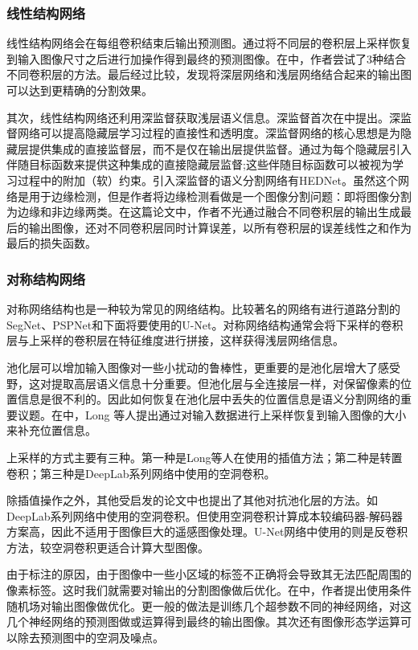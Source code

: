 \subsubsection{线性结构网络}
线性结构网络会在每组卷积结束后输出预测图。通过将不同层的卷积层上采样恢复到输入图像尺寸之后进行加操作得到最终的预测图像。在\cite{long2015fully}中，作者尝试了3种结合不同卷积层的方法。最后经过比较，发现将深层网络和浅层网络结合起来的输出图可以达到更精确的分割效果。

其次，线性结构网络还利用深监督获取浅层语义信息。深监督首次在\cite{lee2015deeply}中提出。深监督网络可以提高隐藏层学习过程的直接性和透明度。深监督网络的核心思想是为隐藏层提供集成的直接监督层，而不是仅在输出层提供监督。通过为每个隐藏层引入伴随目标函数来提供这种集成的直接隐藏层监督;这些伴随目标函数可以被视为学习过程中的附加（软）约束。引入深监督的语义分割网络有HEDNet\cite{xie2015holistically}。虽然这个网络是用于边缘检测，但是作者将边缘检测看做是一个图像分割问题：即将图像分割为边缘和非边缘两类。在这篇论文中，作者不光通过融合不同卷积层的输出生成最后的输出图像，还对不同卷积层同时计算误差，以所有卷积层的误差线性之和作为最后的损失函数。

\subsubsection{对称结构网络}
对称网络结构也是一种较为常见的网络结构。比较著名的网络有进行道路分割的SegNet\cite{badrinarayanan2017segnet}、PSPNet\cite{zhao2017pyramid}和下面将要使用的U-Net\cite{ronneberger2015u}。对称网络结构通常会将下采样的卷积层与上采样的卷积层在特征维度进行拼接，这样获得浅层网络信息。

池化层可以增加输入图像对一些小扰动的鲁棒性，更重要的是池化层增大了感受野，这对提取高层语义信息十分重要。但池化层与全连接层一样，对保留像素的位置信息是很不利的。因此如何恢复在池化层中丢失的位置信息是语义分割网络的重要议题。在\cite{long2015fully}中，Long 等人提出通过对输入数据进行上采样恢复到输入图像的大小来补充位置信息。

上采样的方式主要有三种。第一种是Long等人在\cite{long2015fully}使用的插值方法；第二种是转置卷积；第三种是DeepLab\cite{chen2014semantic}系列网络中使用的空洞卷积。

除插值操作之外，其他受\cite{long2015fully}启发的论文中也提出了其他对抗池化层的方法。如DeepLab\cite{chen2014semantic}系列网络中使用的空洞卷积。但使用空洞卷积计算成本较编码器-解码器方案高，因此不适用于图像巨大的遥感图像处理。U-Net网络中使用的则是反卷积方法，较空洞卷积更适合计算大型图像。

由于标注的原因，由于图像中一些小区域的标签不正确将会导致其无法匹配周围的像素标签。这时我们就需要对输出的分割图像做后优化。在\cite{badrinarayanan2017segnet}中，作者提出使用条件随机场对输出图像做优化。更一般的做法是训练几个超参数不同的神经网络，对这几个神经网络的预测图做或运算得到最终的输出图像。其次还有图像形态学运算可以除去预测图中的空洞及噪点。

